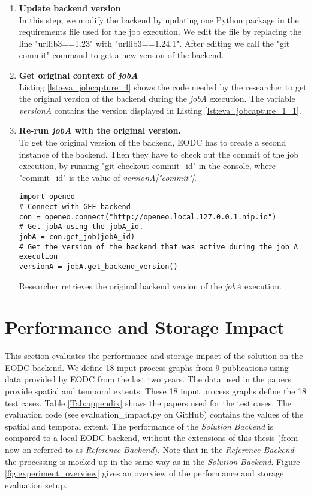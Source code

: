 \documentclass[draft,final]{vutinfth} %
\newenvironment{code}{\captionsetup{type=listing}}{}
\begin{document}
\begin{enumerate}
	\item \textbf{Update backend version} \\
	In this step, we modify the backend by updating one Python package in the requirements file used for the job execution. We edit the file by replacing the line "urllib3==1.23" with "urllib3==1.24.1". After editing we call the "git commit" command to get a new version of the backend. 
	\item \textbf{Get original context of \textit{jobA}} \\
	Listing \ref{lst:eva_jobcapture_4} shows the code needed by the researcher to get the original version of the backend during the \textit{jobA} execution. The variable \textit{versionA} contains the version displayed in Listing \ref{lst:eva_jobcapture_1_1}. 
	\item \textbf{Re-run \textit{jobA} with the original version.} \\
	To get the original version of the backend, EODC has to create a second instance of the backend. Then they have to check out the commit of the job execution, by running "git checkout commit\_id" in the console, where "commit\_id" is the value of \textit{versionA["commit"]}.
	\begin{code}
		\begin{verbatim}
import openeo
# Connect with GEE backend
con = openeo.connect("http://openeo.local.127.0.0.1.nip.io")
# Get jobA using the jobA_id.
jobA = con.get_job(jobA_id)
# Get the version of the backend that was active during the job A execution
versionA = jobA.get_backend_version()
		\end{verbatim}
		\caption{Researcher retrieves the original backend version of the \textit{jobA} execution.}
		\label{lst:eva_jobcapture_4}
	\end{code}	
\end{enumerate}

\section{Performance and Storage Impact}\label{Evaluation:impact}

This section evaluates the performance and storage impact of the solution on the EODC backend. We define 18 input process graphs from 9 publications using data provided by EODC from the last two years. The data used in the papers provide spatial and temporal extents. These 18 input process graphs define the 18 test cases. Table \ref{Tab:appendix} shows the papers used for the test cases. The evaluation code (see evaluation\_impact.py on GitHub) contains the values of the spatial and temporal extent. The performance of the \textit{Solution Backend} is compared to a local EODC backend, without the extensions of this thesis (from now on referred to as \textit{Reference Backend}). Note that in the \textit{Reference Backend} the processing is mocked up in the same way as in the \textit{Solution Backend}. Figure \ref{fig:experiment_overview} gives an overview of the performance and storage evaluation setup.  
\end{document}
